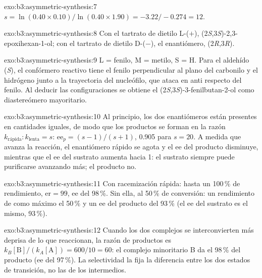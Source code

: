 \begin{solution}{exo:b3:asymmetric-synthesis:7}
$s = \ln(0.40 \times 0.10)/\ln(0.40 \times 1.90) = -3.22/-0.274 = 12$.
\end{solution}

\begin{solution}{exo:b3:asymmetric-synthesis:8}
Con el tartrato de dietilo L-($+$), (2\textit{S},3\textit{S})-2,3-epoxihexan-1-ol; con el tartrato de dietilo D-($-$), el
enantiómero, (2\textit{R},3\textit{R}).
\end{solution}

\begin{solution}{exo:b3:asymmetric-synthesis:9}
L = fenilo, M = metilo, S = H. Para el aldehído (\textit{S}), el confórmero reactivo tiene el fenilo
perpendicular al plano del carbonilo y el hidrógeno junto a la trayectoria del
nucleófilo, que ataca en anti respecto del fenilo. Al deducir las configuraciones se obtiene el
(2\textit{S},3\textit{S})-3-fenilbutan-2-ol como diastereómero mayoritario.
\end{solution}

\begin{solution}{exo:b3:asymmetric-synthesis:10}
Al principio, los dos enantiómeros están presentes en cantidades iguales, de modo que los productos
se forman en la razón $k_{\text{rápida}} : k_{\text{lenta}} = s$: $\mathrm{ee}_p = (s - 1)/(s + 1)$, 0.905 para $s = 20$. A medida que avanza la reacción, el
enantiómero rápido se agota y el ee del producto disminuye, mientras que el ee del sustrato aumenta
hacia 1: el sustrato siempre puede purificarse avanzando más; el producto
no.
\end{solution}

\begin{solution}{exo:b3:asymmetric-synthesis:11}
Con racemización rápida: hasta un 100\,\% de rendimiento, $\mathrm{er} = 99$, ee del 98\,\%. Sin ella, al 50\,\% de
conversión: un rendimiento de como máximo el 50\,\% y un ee del producto del 93\,\% (el ee del sustrato es el
mismo, 93\,\%).
\end{solution}

\begin{solution}{exo:b3:asymmetric-synthesis:12}
Cuando los dos complejos se interconvierten más deprisa de lo que reaccionan, la razón de productos es
$k_B[\mathrm B]/(k_A[\mathrm A]) = 600/10 = 60$: el complejo minoritario B da el 98\,\% del producto (ee del 97\,\%). La
selectividad la fija la diferencia entre los dos estados de transición, no
las  de los intermedios.
\end{solution}

